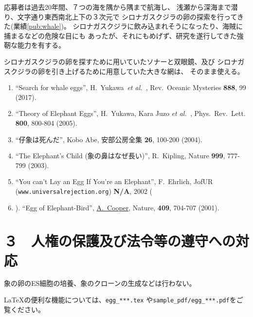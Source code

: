 \documentclass[11pt,a4j,dvipdfmx]{jarticle} 					%
\newcommand{\研究課題名}{象の卵}
\newcommand{\研究機関名}{逢坂大学}
\newcommand{\研究代表者氏名}{湯川秀樹}
\newcommand{\研究期間の最終元号年度}{8}  %
\newcommand{\paper}[6]{%
	\item ``#1'', #2, #3 {\bf #4}, #5 (#6).			%
}
\newcommand{\etal}{\textit{et al.\ }}
\newcommand{\yukawa}{H.~Yukawa}					%
\newcommand{\prl}{Phys.\ Rev.\ Lett.\ }		%
\begin{document}
	応募者は過去20年間、７つの海を隅から隅まで航海し、
	浅瀬から深海まで潜り、文字通り東西南北上下の３次元で
	シロナガスクジラの卵の探索を行ってきた(業績\ref{pub:whale})。
	シロナガスクジラに飲み込まれそうになったり、海賊に捕まるなどの危険な目にも
	あったが、それにもめげず、研究を遂行してきた強靭な能力を有する。

	シロナガスクジラの卵を探すために用いていたソナーと双眼鏡、及び
	シロナガスクジラの卵を引き上げるために用意していた大きな網は、
	そのまま使える。
	\begin{enumerate}
		\paper{Search for whale eggs}{\yukawa\ \etal}{Rev.\ Oceanic Mysteries}{888}{99}{2017}
			\label{pub:whale}
				
		\paper{Theory of Elephant Eggs}{\yukawa, Kara Juzo \etal}{\prl}{800}{800-804}{2005}
			\label{pub:theoegg}
				
		\paper{仔象は死んだ}{Kobo Abe}{安部公房全集}{26}{100-200}{2004}
		
		\paper{The Elephant's Child (象の鼻はなぜ長い)}{R.~Kipling}{Nature}{999}{777-799}{2003}

		\paper{You can't Lay an Egg If You're an Elephant}{F.~Ehrlich}
			{JofUR\\({\tt www.universalrejection.org})}{{\bf N/A}}{2002}
		
		\item ``Egg of Elephant-Bird'', 
				\underline{A.~Cooper},
				Nature, {\bf 409}, 704-707 (2001).	%
	\end{enumerate}




\section{３　人権の保護及び法令等の遵守への対応}

	象の卵のES細胞の培養、象のクローンの生成などは行わない。

	\LaTeX の便利な機能については、\texttt{egg\_***.tex} や\texttt{sample\_pdf/egg\_***.pdf}をご覧ください。
\end{document}
